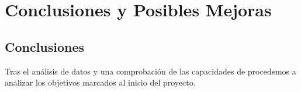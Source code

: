 
\chapter{Conclusiones y Posibles Mejoras} %

\label{Chapter5} %



\section{Conclusiones}

Tras el análisis de datos y una comprobación de las capacidades de \robotto procedemos a analizar los objetivos marcados al inicio del proyecto.\\

